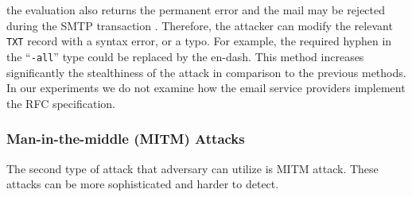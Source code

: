 the evaluation also returns the permanent error and the mail may be rejected during the SMTP transaction \cite{spf}.
%
%
Therefore, the attacker can modify %
the relevant \texttt{TXT} record with a syntax error, or a typo. 
For example, the required hyphen in the ``\texttt{-all}'' type could be replaced by the en-dash. %
This method increases significantly the stealthiness of the attack in comparison to the previous methods. 
In our experiments we do not examine how the email service providers implement the RFC specification.

\begin{comment}
\textbf{Deletion or modification of a \texttt{PTR} record:} 
A \texttt{PTR} record, or a reverse DNS of an IP, translates the IP address to its hostname.
The \texttt{PTR} record is used by different services, notably by e-mail anti-spam techniques to protect recipients from phishing attacks.
Most of receiving mail server checks if the IP address of the sending mail server has a \texttt{PTR} record and if it matches the IP obtained via the forward DNS resolution of the hostname defined in the \texttt{PTR} record.
Emails without the \texttt{PTR} record may get rejected or marked as spam, therefore, the adversary could modify or completely delete the \texttt{PTR} record to prevent recipients from receiving legitimate emails.

The tricky part is that the PTR record is not configured by the DNS service provider but by the ISP, so zone poisoning fails.
\end{comment}



\subsubsection{Man-in-the-middle (MITM) Attacks}
The second type of attack that adversary can utilize is MITM attack. These attacks can be more sophisticated and harder to detect. 

